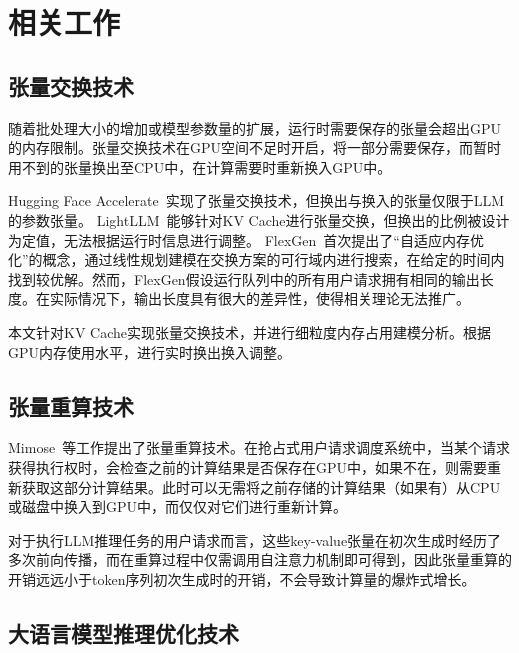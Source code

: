 \section{相关工作}

\subsection{张量交换技术}

随着批处理大小的增加或模型参数量的扩展，运行时需要保存的张量会超出GPU的内存限制。张量交换技术在GPU空间不足时开启，将一部分需要保存，而暂时用不到的张量换出至CPU中，在计算需要时重新换入GPU中。

Hugging Face Accelerate~\cite{Huggingface-Accelerate}实现了张量交换技术，但换出与换入的张量仅限于LLM的参数张量。
LightLLM~\cite{LightLLM}能够针对KV Cache进行张量交换，但换出的比例被设计为定值，无法根据运行时信息进行调整。
FlexGen~\cite{Swapping}首次提出了“自适应内存优化”的概念，通过线性规划建模在交换方案的可行域内进行搜索，在给定的时间内找到较优解。然而，FlexGen假设运行队列中的所有用户请求拥有相同的输出长度。在实际情况下，输出长度具有很大的差异性，使得相关理论无法推广。

本文针对KV Cache实现张量交换技术，并进行细粒度内存占用建模分析。根据GPU内存使用水平，进行实时换出换入调整。

\subsection{张量重算技术}

Mimose~\cite{Recomputation, Recomp_2, Recomp_3}等工作提出了张量重算技术。在抢占式用户请求调度系统中，当某个请求获得执行权时，会检查之前的计算结果是否保存在GPU中，如果不在，则需要重新获取这部分计算结果。此时可以无需将之前存储的计算结果（如果有）从CPU或磁盘中换入到GPU中，而仅仅对它们进行重新计算。

对于执行LLM推理任务的用户请求而言，这些key-value张量在初次生成时经历了多次前向传播，而在重算过程中仅需调用自注意力机制即可得到，因此张量重算的开销远远小于token序列初次生成时的开销，不会导致计算量的爆炸式增长。

\subsection{大语言模型推理优化技术}


